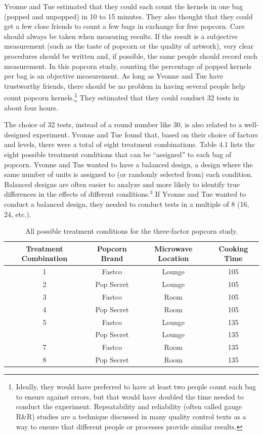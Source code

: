 \documentclass[
]{report}
\begin{document}
Yvonne and Tue estimated that they could each count the kernels in one bag (popped and unpopped) in 10 to 15 minutes. They also thought that they could get a few close friends to count a few bags in exchange for free popcorn. Care should always be taken when measuring results. If the result is a subjective measurement (such as the taste of popcorn or the quality of artwork), very clear procedures should be written and, if possible, the same people should record each measurement. In this popcorn study, counting the percentage of popped kernels per bag is an objective measurement. As long as Yvonne and Tue have trustworthy friends, there should be no problem in having several people help count popcorn kernels.\footnote{Ideally, they would have preferred to have at least two people count each bag to ensure against errors, but that would have doubled the time needed to conduct the experiment. Repeatability and reliability (often called gauge R\&R) studies are a technique discussed in many quality control texts as a way to ensure that different people or processes provide similar results.
  \normalsize} They estimated that they could conduct 32 tests in about four hours.

The choice of 32 tests, instead of a round number like 30, is also related to a well-designed experiment. Yvonne and Tue found that, based on their choice of factors and levels, there were a total of eight treatment combinations. Table 4.1 lists the eight possible treatment conditions that can be ``assigned'' to each bag of popcorn. Yvonne and Tue wanted to have a balanced design, a design where the same number of units is assigned to (or randomly selected from) each condition. Balanced designs are often easier to analyze and more likely to identify true differences in the effects of different conditions.\(^3\) If Yvonne and Tue wanted to conduct a balanced design, they needed to conduct tests in a multiple of 8 (16, 24, etc.).

\begin{table}[!h]
\centering
\caption{\label{tab:tab1}All possible treatment conditions for the three-factor popcorn study.}
\centering
\begin{tabular}[t]{cccc}
\toprule
Treatment Combination & Popcorn Brand & Microwave Location & Cooking Time\\
\midrule
1 & Fastco & Lounge & 105\\
2 & Pop Secret & Lounge & 105\\
3 & Fastco & Room & 105\\
4 & Pop Secret & Room & 105\\
5 & Fastco & Lounge & 135\\
\addlinespace
6 & Pop Secret & Lounge & 135\\
7 & Fastco & Room & 135\\
8 & Pop Secret & Room & 135\\
\bottomrule
\end{tabular}
\end{table}
\end{document}
